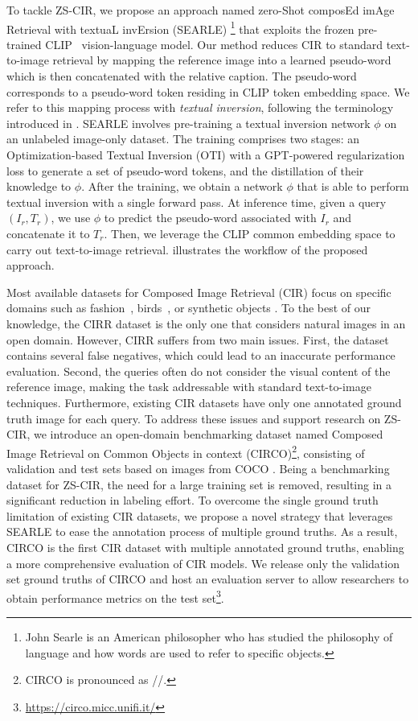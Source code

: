 \documentclass[10pt,twocolumn,letterpaper]{article}
\newcommand{\method}{SEARLE\xspace}
\begin{document}
To tackle ZS-CIR, we propose an approach named zero-Shot composEd imAge Retrieval with textuaL invErsion (\method) \footnote{John Searle is an American philosopher who has studied the philosophy of language and how words are used to refer to specific objects.} that exploits the frozen pre-trained CLIP~\cite{radford2021learning} vision-language model. Our method reduces CIR to standard text-to-image retrieval by mapping the reference image into a learned pseudo-word which is then concatenated with the relative caption. The pseudo-word corresponds to a pseudo-word token residing in CLIP token embedding space. We refer to this mapping process with \textit{textual inversion}, following the terminology introduced in \cite{gal2022image}. \method involves pre-training a textual inversion network $\phi$ on an unlabeled image-only dataset. The training comprises two stages: an Optimization-based Textual Inversion (OTI) with a GPT-powered regularization loss to generate a set of pseudo-word tokens, and the distillation of their knowledge to $\phi$. After the training, we obtain a network $\phi$ that is able to perform textual inversion with a single forward pass. At inference time, given a query $(I_r, T_r)$, we use $\phi$ to predict the pseudo-word associated with $I_r$ and concatenate it to $T_r$. Then, we leverage the CLIP common embedding space to carry out text-to-image retrieval.  illustrates the workflow of the proposed approach.

Most available datasets for Composed Image Retrieval (CIR) focus on specific domains such as fashion~\cite{berg2010automatic, han2017automatic, wu2021fashion, guo2018dialog}, birds~\cite{forbes2019neural}, or synthetic objects \cite{vo2019composing}. To the best of our knowledge, the CIRR dataset \cite{liu2021image} is the only one that considers natural images in an open domain. However, CIRR suffers from two main issues. First, the dataset contains several false negatives, which could lead to an inaccurate performance evaluation. Second, the queries often do not consider the visual content of the reference image, making the task addressable with standard text-to-image techniques. Furthermore, existing CIR datasets have only one annotated ground truth image for each query. To address these issues and support research on ZS-CIR, we introduce an open-domain benchmarking dataset named Composed Image Retrieval on Common Objects in context (CIRCO)\footnote{CIRCO is pronounced as //.}, consisting of validation and test sets based on images from COCO \cite{lin2014microsoft}. Being a benchmarking dataset for ZS-CIR, the need for a large training set is removed, resulting in a significant reduction in labeling effort. To overcome the single ground truth limitation of existing CIR datasets, we propose a novel strategy that leverages \method to ease the annotation process of multiple ground truths. As a result, CIRCO is the first CIR dataset with multiple annotated ground truths, enabling a more comprehensive evaluation of CIR models. We release only the validation set ground truths of CIRCO and host an evaluation server to allow researchers to obtain performance metrics on the test set\footnote{\href{https://circo.micc.unifi.it/}{\url{https://circo.micc.unifi.it/}}}.
\end{document}

